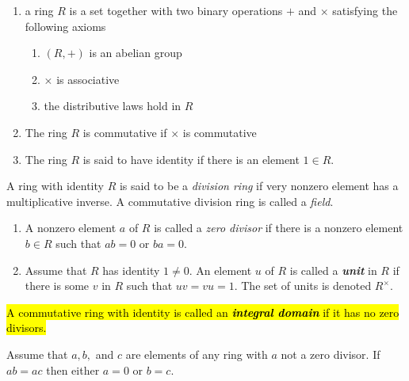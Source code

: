 \begin{defn}\nl
\begin{enumerate}
\item a ring $R$ is a set together with two binary operations $+$ and $\times$ satisfying the following axioms
\begin{enumerate}
\item $(R, +)$ is an abelian group 
\item $\times$ is associative 
\item the distributive laws hold in $R$
\end{enumerate}
\item The ring $R$ is commutative if $\times$ is commutative
\item The ring $R$ is said to have identity if there is an element $1\in R$.
\end{enumerate}

\end{defn}

\nl

\begin{defn}
A ring with identity $R$ is said to be a \textit{division ring} if very nonzero element has a multiplicative inverse. A commutative division ring is called a \textit{field}.
\end{defn}

\nl

\begin{defn}\nl
\begin{enumerate}
\item A nonzero element $a$ of $R$ is called a \textit{zero divisor} if there is a nonzero element $b\in R$ such that $ab = 0$ or $ba = 0$.
\item Assume that $R$ has identity $1\neq 0$. An element $u$ of $R$ is called a \textit{\textbf{unit}} in $R$ if there is some $v$ in $R$ such that $uv=vu=1$. The set of units is denoted $R^\times$.
\end{enumerate}
\end{defn}

\nl

\begin{defn}
\hl{A commutative ring with identity is called an \textit{\textbf{integral domain}} if it has no zero divisors.}
\end{defn}

\nl

\begin{prop}
Assume that $a,b,$ and $c$ are elements of any ring with $a$ not a zero divisor. If $ab=ac$ then either $a=0$ or $b=c$.
\end{prop}

